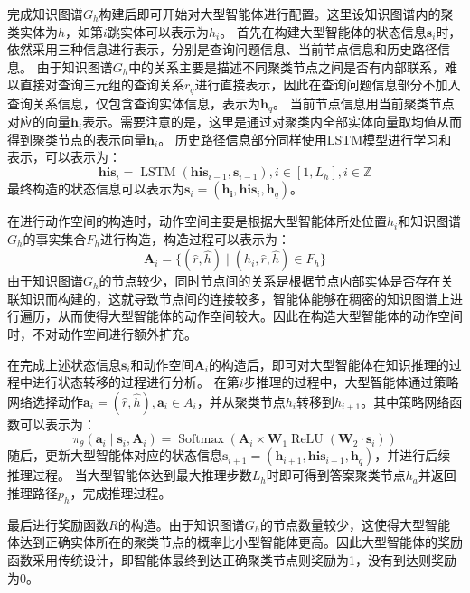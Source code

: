 \documentclass[algorithmlist, AutoFakeBold, AutoFakeSlant, figurelist, tablelist, nomlist, engineering, openany]{seuthesix} %
\begin{document}
完成知识图谱$G_h$构建后即可开始对大型智能体进行配置。这里设知识图谱内的聚类实体为$h$，如第$i$跳实体可以表示为$h_i$。
首先在构建大型智能体的状态信息$\bm{s}_i$时，依然采用三种信息进行表示，分别是查询问题信息、当前节点信息和历史路径信息。
由于知识图谱$G_h$中的关系主要是描述不同聚类节点之间是否有内部联系，难以直接对查询三元组的查询关系$r_q$进行直接表示，因此在查询问题信息部分不加入查询关系信息，仅包含查询实体信息，表示为$\bm{h}_q$。
当前节点信息用当前聚类节点对应的向量$\bm{h}_i$表示。需要注意的是，这里是通过对聚类内全部实体向量取均值从而得到聚类节点的表示向量$\bm{h}_i$。
历史路径信息部分同样使用LSTM模型进行学习和表示，可以表示为：
\begin{equation}
  \bm{his}_i=\operatorname{LSTM}\left(\bm{his}_{i - 1}, \bm{s}_{i - 1}\right), i \in [1, L_h], i \in \mathbb{Z}
\end{equation}
最终构造的状态信息可以表示为$\bm{s}_i = (\bm{h_i}, \bm{his}_i, \bm{h}_q)$。

在进行动作空间的构造时，动作空间主要是根据大型智能体所处位置$h_i$和知识图谱$G_h$的事实集合$F_h$进行构造，构造过程可以表示为：
\begin{equation}
  \bm{A}_i = \{(\hat{r}, \hat{h}) \mid (h_i, \hat{r}, \hat{h}) \in F_h\}
  \label{base_2}
\end{equation}
由于知识图谱$G_h$的节点较少，同时节点间的关系是根据节点内部实体是否存在关联知识而构建的，这就导致节点间的连接较多，智能体能够在稠密的知识图谱上进行遍历，从而使得大型智能体的动作空间较大。因此在构造大型智能体的动作空间时，不对动作空间进行额外扩充。

在完成上述状态信息$\bm{s}_i$和动作空间$\bm{A}_i$的构造后，即可对大型智能体在知识推理的过程中进行状态转移的过程进行分析。
在第$i$步推理的过程中，大型智能体通过策略网络选择动作$\bm{a}_i = (\hat{r}, \hat{h}), \bm{a}_i \in A_i$，并从聚类节点$h_i$转移到$h_{i+1}$。其中策略网络函数可以表示为：
\begin{equation}
  \pi_\theta\left(\bm{a}_i \mid \bm{s}_i, \bm{A}_i\right) =\operatorname{Softmax}\left(\bm{A}_i \times \mathbf{W}_1 \operatorname{ReLU}\left(\mathbf{W}_2 \cdot \bm{s}_i\right)\right)
\end{equation}
随后，更新大型智能体对应的状态信息$\bm{s}_{i+1} = (\bm{h}_{i+1}, \bm{his}_{i+1}, \bm{h}_q)$，并进行后续推理过程。
当大型智能体达到最大推理步数$L_h$时即可得到答案聚类节点$h_a$并返回推理路径$p_h$，完成推理过程。

最后进行奖励函数$R$的构造。由于知识图谱$G_h$的节点数量较少，这使得大型智能体达到正确实体所在的聚类节点的概率比小型智能体更高。因此大型智能体的奖励函数采用传统设计，即智能体最终到达正确聚类节点则奖励为1，没有到达则奖励为0。
\end{document}
